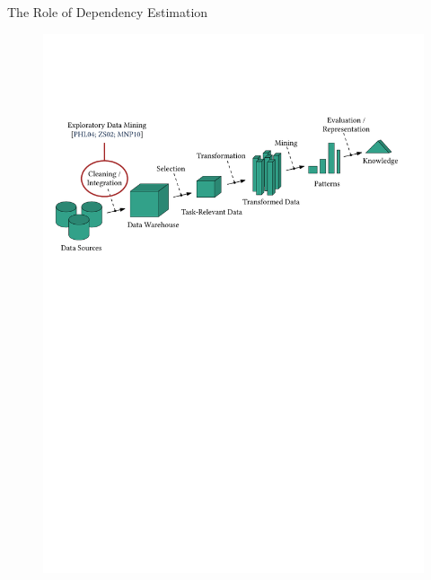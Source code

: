 \documentclass[16pt,usenames,dvipsnames, notheorems]{beamer}
\theoremstyle{definition}
\theoremstyle{example}
\theoremstyle{plain}
\begin{document}
\begin{frame}{The Role of Dependency Estimation}
\begin{figure}
\begin{overprint}
		 \includegraphics[width=0.98\linewidth]{figures/kdd_r1-compressed.pdf}

\end{overprint}
\end{figure}
\end{frame}
\end{document}
